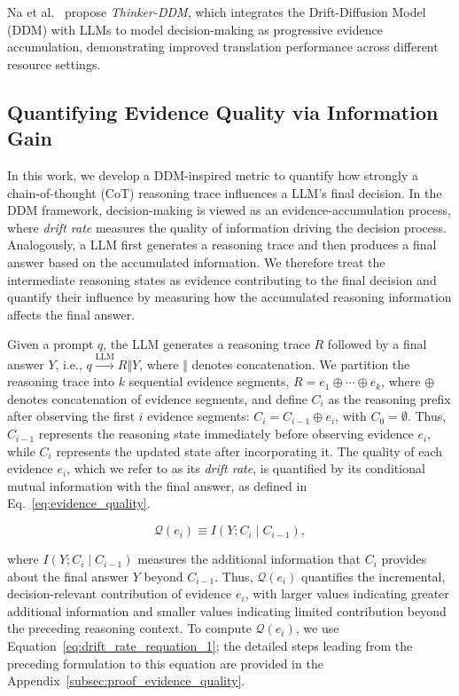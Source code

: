 \documentclass{article} %
\begin{document}
Na et al.~\citep{na-etal-2025-thinker} propose \emph{Thinker-DDM}, which integrates the Drift-Diffusion Model (DDM) with LLMs to model decision-making as progressive evidence accumulation, demonstrating improved translation performance across different resource settings.

\subsection{Quantifying Evidence Quality via Information Gain}
\label{subsec:Quantifying Evidence Quality via Information Gain}

In this work, we develop a DDM-inspired metric to quantify how strongly a chain-of-thought (CoT) reasoning trace influences a LLM's final decision. In the DDM framework, decision-making is viewed as an evidence-accumulation process, where \emph{drift rate} measures the quality of information driving the decision process. Analogously, a LLM first generates a reasoning trace and then produces a final answer based on the accumulated information. We therefore treat the intermediate reasoning states as evidence contributing to the final decision and quantify their influence by measuring how the accumulated reasoning information affects the final answer.

Given a prompt $q$, the LLM generates a reasoning trace $R$ followed by a final answer $Y$, i.e., $q \xrightarrow{\mathrm{LLM}} R \Vert Y$, where $\Vert$ denotes concatenation. We partition the reasoning trace into $k$ sequential evidence segments, $R=e_1\oplus\cdots\oplus e_k$, where $\oplus$ denotes concatenation of evidence segments, and define $C_i$ as the reasoning prefix after observing the first $i$ evidence segments: $C_i=C_{i-1}\oplus e_i$, with $C_0=\emptyset$. Thus, $C_{i-1}$ represents the reasoning state immediately before observing evidence $e_i$, while $C_i$ represents the updated state after incorporating it. The quality of each evidence $e_i$, which we refer to as its \emph{drift rate}, is quantified by its conditional mutual information with the final answer, as defined in Eq.~\ref{eq:evidence_quality}.


\begin{equation}
\mathcal{Q}(e_i)
\equiv
I\left(Y; C_i \mid C_{i-1}\right),
\label{eq:evidence_quality}
\end{equation}

where $I(Y;C_i\mid C_{i-1})$ measures the additional information that $C_i$ provides about the final answer $Y$ beyond $C_{i-1}$. Thus, $\mathcal{Q}(e_i)$ quantifies the incremental, decision-relevant contribution of evidence $e_i$, with larger values indicating greater additional information and smaller values indicating limited contribution beyond the preceding reasoning context. To compute $\mathcal{Q}(e_i)$, we use Equation~\ref{eq:drift_rate_requation_1}; the detailed steps leading from the preceding formulation to this equation are provided in the Appendix~\ref{subsec:proof_evidence_quality}.
\end{document}
